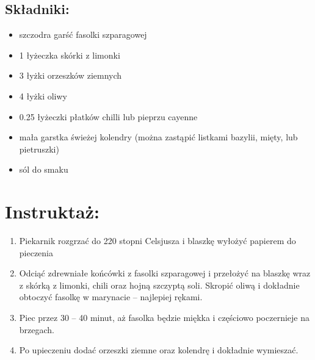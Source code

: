 \documentclass[a4paper,10pt]{book}
\begin{document}
\begin{multicols}{2}

\section*{Składniki:}
\begin{itemize}
    \item szczodra garść fasolki szparagowej
    \item 1 łyżeczka skórki z limonki
    \item 3 łyżki orzeszków ziemnych
    \item 4 łyżki oliwy 
    \item 0.25 łyżeczki płatków chilli lub pieprzu cayenne
    \item mała garstka świeżej kolendry (można zastąpić listkami bazylii, mięty, lub pietruszki)
    \item sól do smaku
\end{itemize}

\columnbreak

\begin{figure}[H]
    \centering
\end{figure}
\end{multicols}

\vspace{0.5cm} 

\section*{Instruktaż:}
\begin{enumerate}
    \item Piekarnik rozgrzać do 220 stopni Celsjusza i blaszkę wyłożyć papierem do pieczenia
    \item Odciąć zdrewniałe końcówki z fasolki szparagowej i przełożyć na blaszkę wraz z skórką z limonki, chili oraz hojną szczyptą soli. Skropić oliwą i dokładnie obtoczyć fasolkę w marynacie – najlepiej rękami.
    \item Piec przez 30 – 40 minut, aż fasolka będzie miękka i częściowo poczernieje na brzegach.
    \item Po upieczeniu dodać orzeszki ziemne oraz kolendrę i dokładnie wymieszać. 
\end{enumerate}
\end{document}
